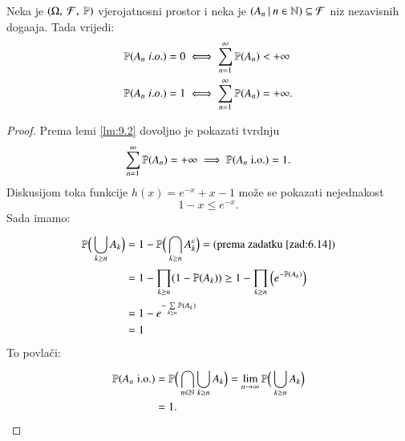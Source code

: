 \begin{tm}   \label{tm:9.3}
    Neka je $(\Omega, \: \mathcal{F}, \: \mathbb{P})$ vjerojatnosni prostor i neka je $({A_n} \: | \: {n \in \mathbb{N}}) \subseteq \mathcal{F}$ niz nezavisnih doga\dj aja.
    Tada vrijedi:
    \begin{equation*}
        \begin{aligned}
            \mathbb{P}({A_n \; i.o.}) = 0 &\iff \sum\limits_{n = 1}^{\infty} \mathbb{P}({A_n}) < +\infty\\
            \mathbb{P}({A_n \; i.o.}) = 1 &\iff \sum\limits_{n = 1}^{\infty} \mathbb{P}({A_n}) = +\infty.
        \end{aligned}
    \end{equation*}
\end{tm}

\begin{proof}
    Prema lemi \ref{lm:9.2} dovoljno je pokazati tvrdnju
    \begin{equation*}
        \sum\limits_{n = 1}^{\infty} \mathbb{P}({A_n}) = + \infty \implies \mathbb{P}({A_n \; \mathrm{i.o.}}) = 1.
    \end{equation*}
    Diskusijom toka funkcije $h(x) = e^{-x} + x - 1$ mo\v ze se pokazati nejednakost
    \begin{equation*}
        1 - x \leq e^{-x}.
    \end{equation*}
    Sada imamo:
    \begin{equation*}
        \begin{aligned}
            \mathbb{P} \Big(\bigcup\limits_{k \geq n}^{} A_k \Big) &= 1 - \mathbb{P} \Big( \bigcap\limits_{k \geq n}^{} A_k^c \Big) = (\textnormal{prema zadatku \ref{zad:6.14}})\\
            &= 1 - \prod\limits_{k \geq n}^{} (1 - \mathbb{P}({A_k})) \geq 1 - \prod\limits_{k \geq n}^{} \Big( e^{- \mathbb{P} (A_k)} \Big)\\
            &= 1 - e^{- \sum\limits_{k \geq n}^{} \mathbb{P}({A_k})}\\
            &= 1
        \end{aligned}
    \end{equation*}
    To povla\v ci:
    \begin{equation*}
        \begin{aligned}
            \mathbb{P} ( A_n \; \mathrm{i.o.} ) &= \mathbb{P} \Big( \bigcap\limits_{n \in \mathbb{N}}^{} \bigcup\limits_{k \geq n}^{} A_k \Big) = \lim\limits_{n \to \infty} \mathbb{P} \Big( \bigcup\limits_{k \geq n}^{} A_k \Big)\\
            &= 1.
        \end{aligned}
    \end{equation*}
\end{proof}

